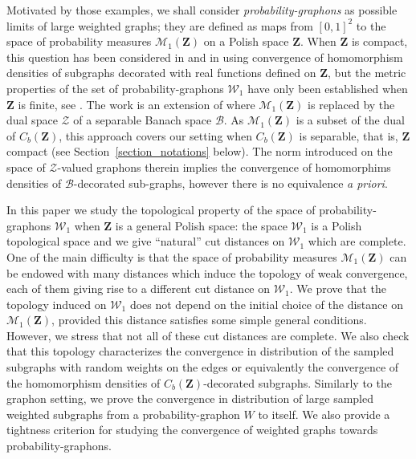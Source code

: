 \documentclass{amsart}
\theoremstyle{plain}
\theoremstyle{definition}
\newcommand{\Space}{\mathbf{Z}}
\newcommand{\cB}{\mathcal{B}}
\newcommand{\cZ}{\mathcal{Z}}
\newcommand{\Proba}{\mathcal{M}_1(\Space)}
\newcommand{\CbFunct}{C_b(\Space)}
\newcommand{\Graphon}{\mathcal{W}_1}
\begin{document}
\medskip

Motivated by  those examples, we shall  consider \emph{probability-graphons} as
possible limits of large weighted graphs;  they are defined as maps from
$ [0,1]^2$  to the space  of probability  measures $\Proba$ on  a Polish
space  $\Space$.   When $\Space$  is  compact,  this question  has  been
considered    in    \cite{lovaszLimitsCompactDecorated2010}    and    in
\cite[Section 17.1]{Lovasz} using  convergence of homomorphism densities
of subgraphs decorated with real  functions defined on $\Space$, but the
metric  properties of  the set  of probability-graphons  $\Graphon$ have
only    been   established    when    $\Space   $    is   finite,    see
\cite{falgas-ravryMulticolourContainersEntropy2016}.
The work \cite{kunszenti-kovacsMultigraphLimitsUnbounded2022} is  
an  extension of  \cite{lovaszLimitsCompactDecorated2010} where
$\Proba$ is replaced by the dual space $\cZ$
of  a   separable  Banach   space  $\cB$. As $\Proba$ is a subset of the
dual of $\CbFunct$, this approach covers our setting when $\CbFunct$ is
separable, that is, $\Space$  compact   (see
Section~\ref{section_notations} below). The
norm introduced on the space of $\cZ$-valued graphons therein implies
the convergence of homomorphims densities of $\cB$-decorated sub-graphs,
however there is no equivalence \emph{a priori}. 

\medskip

In  this  paper we  study  the  topological  property  of the  space  of
probability-graphons $\Graphon$ when $\Space$ is a general Polish space:
the space $\Graphon$  is a Polish topological space and  we give ``natural''
cut distances on $\Graphon$ which are complete.  
One of the main difficulty is that the space of probability measures
$\Proba$ can be endowed with many distances which induce the topology
of weak convergence, each of them giving rise to a different cut
distance on $\Graphon$.  We prove that the topology induced on $\Graphon
$ does not depend on the initial choice of the distance on $\Proba$,
provided this distance satisfies some simple general conditions. 
However,   we stress that not all of these cut distances are complete.
We also check that 
this topology  characterizes the convergence 
in distribution of the sampled subgraphs with random weights on the edges or equivalently the convergence 
of the homomorphism densities of $\CbFunct$-decorated subgraphs. 
Similarly to the graphon setting, we  prove  the
convergence in distribution of 
large sampled weighted subgraphs from a probability-graphon $W$ to
itself. 
We  also  provide a tightness criterion  for studying the 
convergence  of  weighted   graphs  towards  probability-graphons.
\end{document}
